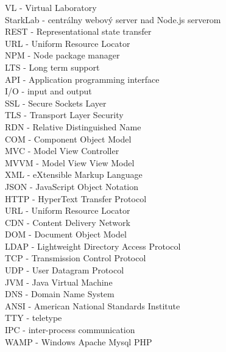 VL - Virtual Laboratory\\
StarkLab - centrálny webový server nad Node.js serverom\\
REST - Representational state transfer\\
URL - Uniform Resource Locator\\
NPM - Node package manager\\
LTS - Long term support\\
API - Application programming interface\\
I/O - input and output\\
SSL - Secure Sockets Layer\\
TLS - Transport Layer Security\\
RDN - Relative Distinguished Name\\
COM - Component Object Model\\
MVC - Model View Controller\\
MVVM - Model View View Model\\
XML - eXtensible Markup Language\\
JSON - JavaScript Object Notation\\
HTTP - HyperText Transfer Protocol\\
URL - Uniform Resource Locator\\
CDN - Content Delivery Network\\
DOM - Document Object Model\\
LDAP - Lightweight Directory Access Protocol\\
TCP - Transmission Control Protocol\\
UDP - User Datagram Protocol\\
JVM - Java Virtual Machine\\
DNS - Domain Name System\\
ANSI - American National Standards Institute\\
TTY - teletype\\
IPC - inter-process communication\\
WAMP - Windows Apache Mysql PHP\\

